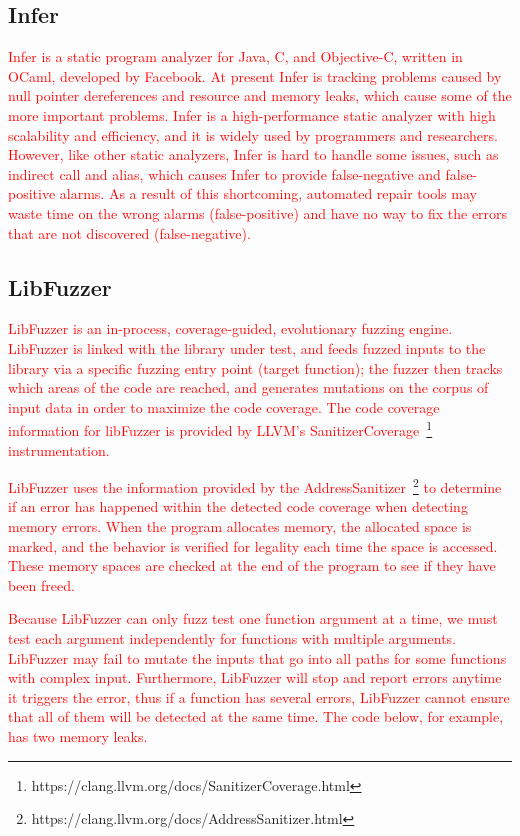 \documentclass[a4j,dvipdfmx]{article}
\begin{document}
\subsection{Infer}
\textcolor{red}{
Infer is a static program analyzer for Java, C, and Objective-C, written in OCaml, developed by Facebook. At present Infer is tracking problems caused by null pointer dereferences and resource and memory leaks, which cause some of the more important problems. Infer is a high-performance static analyzer with high scalability and efficiency, and it is widely used by programmers and researchers. However, like other static analyzers, Infer is hard to handle some issues, such as indirect call and alias, which causes Infer to provide false-negative and false-positive alarms. As a result of this shortcoming, automated repair tools may waste time on the wrong alarms (false-positive) and have no way to fix the errors that are not discovered (false-negative).
}

\subsection{LibFuzzer}
\textcolor{red}{
LibFuzzer is an in-process, coverage-guided, evolutionary fuzzing engine. LibFuzzer is linked with the library under test, and feeds fuzzed inputs to the library via a specific fuzzing entry point (target function); the fuzzer then tracks which areas of the code are reached, and generates mutations on the corpus of input data in order to maximize the code coverage. The code coverage information for libFuzzer is provided by LLVM’s SanitizerCoverage~\footnote{https://clang.llvm.org/docs/SanitizerCoverage.html} instrumentation.
}	

\textcolor{red}{
LibFuzzer uses the information provided by the AddressSanitizer~\footnote{https://clang.llvm.org/docs/AddressSanitizer.html} to determine if an error has happened within the detected code coverage when detecting memory errors. When the program allocates memory, the allocated space is marked, and the behavior is verified for legality each time the space is accessed. These memory spaces are checked at the end of the program to see if they have been freed.
}

\textcolor{red}{
Because LibFuzzer can only fuzz test one function argument at a time, we must test each argument independently for functions with multiple arguments. LibFuzzer may fail to mutate the inputs that go into all paths for some functions with complex input. Furthermore, LibFuzzer will stop and report errors anytime it triggers the error, thus if a function has several errors, LibFuzzer cannot ensure that all of them will be detected at the same time. The code below, for example, has two memory leaks. 
}
\end{document}
